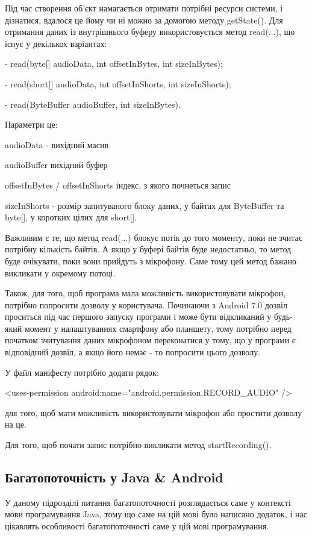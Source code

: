 Під час створення об'єкт намагається отримати потрібні ресурси системи, і дізнатися, вдалося це йому чи ні можно за домогою методу getState(). Для отримання даних із внутрішнього буферу використовується метод read(...), що існує у декількох варіантах:

- read(byte[] audioData, int offsetInBytes, int sizeInBytes);

- read(short[] audioData, int offsetInShorts, int sizeInShorts);

- read(ByteBuffer audioBuffer, int sizeInBytes).

Параметри це:

audioData - вихідний масив

audioBuffer	вихідний буфер

offsetInBytes / offsetInShorts	індекс, з якого почнеться запис

sizeInShorts - розмір запитуваного блоку даних, у байтах для ByteBuffer та byte[], у коротких цілих для short[].

Важливим є те, що метод read(...) блокує потік до того моменту, поки не зчитає потрібну кількість байтів. А якщо у буфері байтів буде недостатньо, то метод буде очікувати, поки вони прийдуть з мікрофону. Саме тому цей метод бажано викликати у окремому потоці.

Також, для того, щоб програма мала можливість використовувати мікрофон, потрібно попросити дозволу у користувача. Починаючи з Android 7.0 дозвіл проситься під час першого запуску програми і може бути відкликаний у будь-який момент у налаштуваннях смартфону або планшету, тому потрібно перед початком зчитування даних мікрофоном переконатися у тому, що у програми є відповідний дозвіл, а якщо його немає - то попросити цього дозволу.

У файл маніфесту потрібно додати рядок:

<uses-permission android:name="android.permission.RECORD\_AUDIO" />

для того, щоб мати можливість використовувати мікрофон або простити дозволу на це.

Для того, щоб почати запис потрібно викликати метод startRecording().

\subsection{Багатопоточність у Java \& Android}

У даному підрозділі питання багатопоточності розглядається саме у контексті мови програмування Java, тому що саме на цій мові було написано додаток, і нас цікавлять особливості багатопоточності саме у цій мові програмування.

